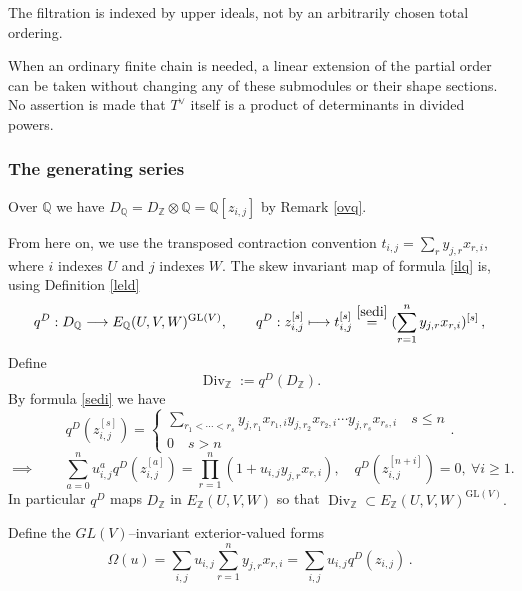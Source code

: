 \documentclass[10pt]{amsart}
\def\steq#1{ \stackrel{\eqref{#1}}}
\theoremstyle{definition}
\theoremstyle{remark}
\newcommand{\Z}{\mathbb Z}
\newcommand{\Q}{\mathbb Q}
\newcommand{\Div}{\operatorname{Div}}
\begin{document}
The filtration is indexed by upper ideals, not by an arbitrarily
chosen total ordering.  \smallskip

When an ordinary finite chain is needed,
a linear extension of the partial order can be taken without
changing any of these submodules or their shape sections.
No assertion is made that $T^\vee$ itself is a product of determinants in
divided powers.\smallskip



 \subsubsection{The generating series}
Over $\mathbb Q$ we have $D_{\mathbb Q}=D_{\mathbb Z}\otimes \Q=\Q[z_{i,j}]$ by Remark \ref{ovq}.

 From here on, we use the transposed contraction convention $t_{i,j}=\sum_r y_{j,r}x_{r,i}$, where $i$ indexes $U$ and $j$ indexes $W$. The skew invariant map  of formula \eqref{ilq}   is, using Definition \ref{leld}
\begin{equation}\label{eq:q-divided-Q}
 q^D :D_{\mathbb Q}\longrightarrow
 E_{\mathbb Q}(U,V,W)^{\mathrm{GL}(V)},
 \qquad q^D :z_{i,j}^{[s]}\longmapsto
 t_{i,j}^{[s]}\steq{sedi}=(\sum_{r=1}^ny_{j,r}x_{r,i})^{[s]}\,,
\end{equation}
   Define
\begin{equation}\label{eq:DivZ-definition}
 \Div_{\mathbb Z}:=q^D (D_{\mathbb Z}).
\end{equation} By formula \eqref{sedi} we have $$q^D (z_{i,j}^{[s]}) =\begin{cases}
\sum_{r_1<\cdots<r_s}y_{j,r_1}x_{r_1,i}y_{j,r_2}x_{r_2,i}\cdots y_{j,r_s}x_{r_s,i}\quad s\leq n\\0\quad s>n
\end{cases}.$$
\begin{equation}\label{ors}\implies\qquad 
\sum_{a=0}^nu_{i,j}^aq^D (z_{i,j}^{[a]}) =\prod_{ r=1}^n(1+u_{i,j} y_{j,r}x_{r,i}),\quad q^D (z_{i,j}^{[n+i]})=0,\ \forall i\geq 1.
\end{equation}
In particular $q^D$  maps $D_\Z$ in  $E_{\mathbb Z}(U,V,W)$ so that $ \Div_{\mathbb Z}\subset E_{\mathbb Z}(U,V,W)^{\mathrm{GL}(V)}.$\medskip

 
Define the $GL(V)$--invariant exterior-valued forms
\begin{equation}\label{lafd}
\Omega(u) =\sum_{i,j}u_{i,j}\sum_{r=1}^ny_{j,r}x_{r,i}=\sum_{i,j}u_{i,j}q^{ D}(z_{i,j})\,.
\end{equation}
  
\end{document}
